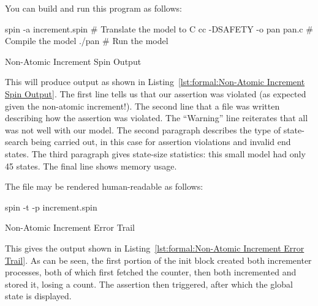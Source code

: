 You can build and run this program as follows:

\begin{VerbatimU}
spin -a increment.spin      # Translate the model to C
cc -DSAFETY -o pan pan.c    # Compile the model
./pan                       # Run the model
\end{VerbatimU}

\begin{listing}
\vspace*{-9pt}
\caption{Non-Atomic Increment Spin Output}
\label{lst:formal:Non-Atomic Increment Spin Output}
\end{listing}

This will produce output as shown in
Listing~\ref{lst:formal:Non-Atomic Increment Spin Output}.
The first line tells us that our assertion was violated (as expected
given the non-atomic increment!).
The second line that a  file was written describing how the
assertion was violated.
The ``Warning'' line reiterates that all was not well with our model.
The second paragraph describes the type of state-search being carried out,
in this case for assertion violations and invalid end states.
The third paragraph gives state-size statistics: this small model had only
45 states.
The final line shows memory usage.

The  file may be rendered human-readable as follows:

\begin{VerbatimU}
spin -t -p increment.spin
\end{VerbatimU}

\begin{listing*}
\IfEbookSize{\vspace*{7pt}}{\vspace*{-9pt}}
\caption{Non-Atomic Increment Error Trail}
\label{lst:formal:Non-Atomic Increment Error Trail}
\end{listing*}

This gives the output shown in
Listing~\ref{lst:formal:Non-Atomic Increment Error Trail}.
As can be seen, the first portion of the init block created both
incrementer processes, both of which first fetched the counter,
then both incremented and stored it, losing a count.
The assertion then triggered, after which the global state is displayed.

